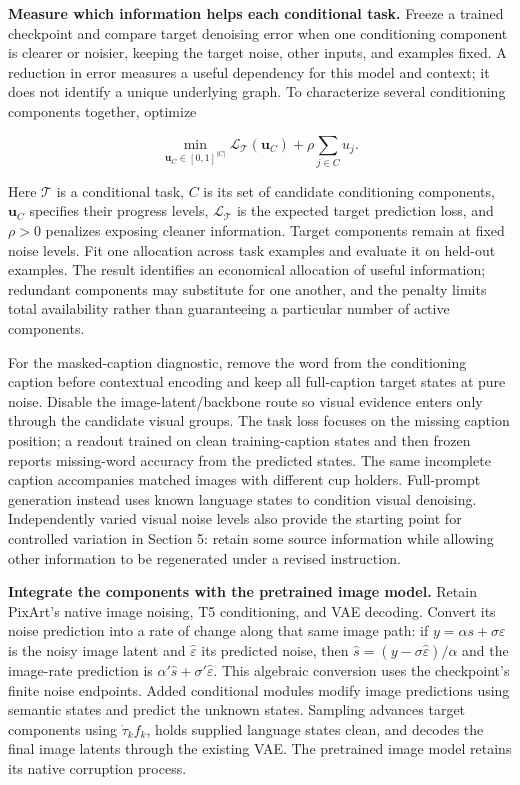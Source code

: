 \documentclass[11pt,letterpaper]{article}
\begin{document}
\textbf{Measure which information helps each conditional task.} Freeze a trained checkpoint and compare target denoising error when one conditioning component is clearer or noisier, keeping the target noise, other inputs, and examples fixed. A reduction in error measures a useful dependency for this model and context; it does not identify a unique underlying graph. To characterize several conditioning components together, optimize

\[
\min_{\mathbf u_C\in[0,1]^{|C|}}
\mathcal L_{\mathcal T}(\mathbf u_C)
+\rho\sum_{j\in C}u_j.
\]

Here \(\mathcal T\) is a conditional task, \(C\) is its set of candidate conditioning components, \(\mathbf u_C\) specifies their progress levels, \(\mathcal L_{\mathcal T}\) is the expected target prediction loss, and \(\rho>0\) penalizes exposing cleaner information. Target components remain at fixed noise levels. Fit one allocation across task examples and evaluate it on held-out examples. The result identifies an economical allocation of useful information; redundant components may substitute for one another, and the penalty limits total availability rather than guaranteeing a particular number of active components.

For the masked-caption diagnostic, remove the word from the conditioning caption before contextual encoding and keep all full-caption target states at pure noise. Disable the image-latent/backbone route so visual evidence enters only through the candidate visual groups. The task loss focuses on the missing caption position; a readout trained on clean training-caption states and then frozen reports missing-word accuracy from the predicted states. The same incomplete caption accompanies matched images with different cup holders. Full-prompt generation instead uses known language states to condition visual denoising. Independently varied visual noise levels also provide the starting point for controlled variation in Section 5: retain some source information while allowing other information to be regenerated under a revised instruction.

\textbf{Integrate the components with the pretrained image model.} Retain PixArt's native image noising, T5 conditioning, and VAE decoding. Convert its noise prediction into a rate of change along that same image path: if \(y=\alpha s+\sigma\varepsilon\) is the noisy image latent and \(\widehat\varepsilon\) its predicted noise, then \(\widehat s=(y-\sigma\widehat\varepsilon)/\alpha\) and the image-rate prediction is \(\alpha'\widehat s+\sigma'\widehat\varepsilon\). This algebraic conversion uses the checkpoint's finite noise endpoints. Added conditional modules modify image predictions using semantic states and predict the unknown states. Sampling advances target components using \(\dot\tau_k f_k\), holds supplied language states clean, and decodes the final image latents through the existing VAE. The pretrained image model retains its native corruption process.
\end{document}
